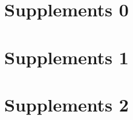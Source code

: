 \documentclass[11pt]{report}
\theoremstyle{plain}
\theoremstyle{definition}
\begin{document}
\chapter{Supplements 0}

\chapter{Supplements 1}

\chapter{Supplements 2}

\end{document}
